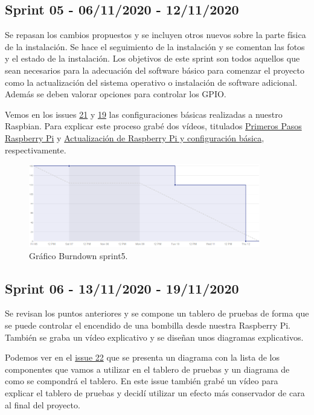 \subsection{Sprint 05 - 06/11/2020 - 12/11/2020}
Se repasan los cambios propuestos y se incluyen otros nuevos sobre la parte física de la instalación. Se hace el seguimiento de la instalación y se comentan las fotos y el estado de la instalación.
Los objetivos de este sprint son todos aquellos que sean necesarios para la adecuación del software básico para comenzar el proyecto como la actualización del sistema operativo o instalación de software adicional. Además se deben valorar opciones para controlar los GPIO.

\item Vemos en los issues \href{https://github.com/davidelinformatico/TFG/issues/21}{21} y \href{https://github.com/davidelinformatico/TFG/issues/19}{19} las configuraciones básicas realizadas a nuestro Raspbian. Para explicar este proceso grabé dos vídeos, titulados \href{https://youtu.be/B8E6q1fLp7Q}{Primeros Pasos Raspberry Pi} y \href{https://youtu.be/Vz38sGYpcYQ}{Actualización de Raspberry Pi y configuración básica}, respectivamente.

\begin{figure}[h]
    \centering
    \includegraphics[width=0.9\textwidth]{img/BurnDown/5.PNG}
    \caption{Gráfico Burndown sprint5. } \label{BD5}
\end{figure}

\subsection{Sprint 06 - 13/11/2020 - 19/11/2020}
Se revisan los puntos anteriores y se compone un tablero de pruebas de forma que se puede controlar el encendido de una bombilla desde nuestra Raspberry Pi. También se graba un vídeo explicativo y se diseñan unos diagramas explicativos.

Podemos ver en el \href{https://github.com/davidelinformatico/TFG/issues/22}{issue 22} que se presenta un diagrama con la lista de los componentes que vamos a utilizar en el tablero de pruebas y un diagrama de como se compondrá el tablero. En este issue también grabé un vídeo para explicar el tablero de pruebas y decidí utilizar un efecto más conservador de cara al final del proyecto.

